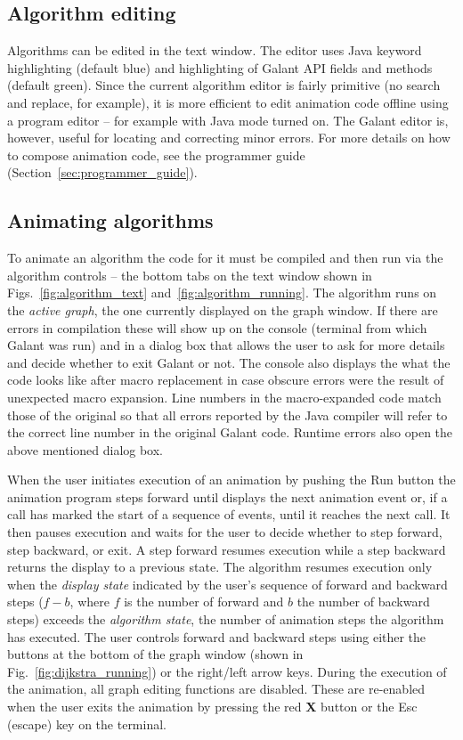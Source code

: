 \subsection{Algorithm editing}
\label{sec:algorithm_editing}

Algorithms can be edited in the text window. The
editor uses Java keyword highlighting (default blue) and
highlighting of Galant API fields and methods (default green).
Since the current algorithm editor is fairly primitive (no search and replace, for example),
it is more efficient to edit animation code offline using a program editor --
for example  with Java mode turned on.
The Galant editor is, however, useful for locating and correcting minor errors.
For more details on how to compose animation code, see the programmer guide
(Section~\ref{sec:programmer_guide}).

\subsection{Animating algorithms}
\label{sec:animating_algorithms}

To animate an algorithm the code for it must be compiled and then run via the
algorithm controls
 -- the bottom tabs on the text window shown in Figs.~\ref{fig:algorithm_text}
and~\ref{fig:algorithm_running}.
The algorithm runs on the \emph{active graph}, the one currently displayed
on the graph window.
If there are errors in compilation these will show up on the console (terminal
from which Galant was run) and in a dialog box that allows the user to ask for more details
and decide whether to exit Galant or not.
The console also displays the what the code looks like after macro replacement
in case obscure errors were the result of unexpected macro expansion.
Line numbers in the macro-expanded code match those of the original so that
all errors reported by the Java compiler will refer to the correct line number
in the original Galant code.
Runtime errors also open the above mentioned
dialog box.

When the user initiates execution of an animation by pushing the \textsf{Run}
button
the animation program
steps forward until
displays the next animation event or, if a 
call has marked the start of a sequence of events, until
it reaches the next  call.
It then pauses execution and waits for the user to decide whether to
step forward, step backward, or exit.
A step forward resumes execution while a step backward returns the display to a previous
state.
The algorithm resumes execution only when the \emph{display state}
indicated by the user's sequence of forward and backward steps
($f-b$, where $f$ is the number of forward and $b$ the number of backward steps)
exceeds the \emph{algorithm state}, the number of animation steps the algorithm
has executed.
The user controls forward and backward steps using either the buttons at the
bottom of the graph window (shown in Fig.~\ref{fig:dijkstra_running})
or the right/left arrow keys.
During the execution of the animation, all graph editing functions are disabled.
These are re-enabled when the user exits the animation by pressing the red \textbf{X} button or the \textsf{Esc} (escape) key on the terminal.

